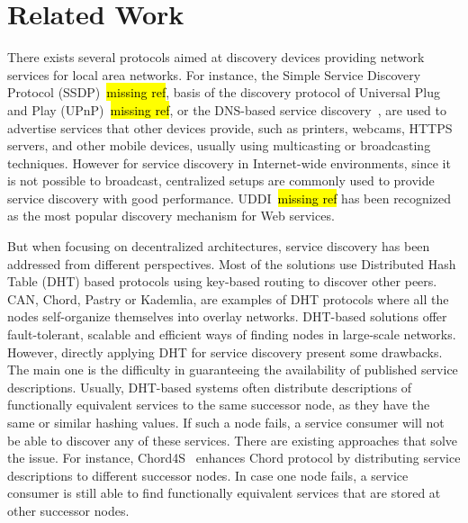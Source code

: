 
\section{Related Work}
\label{sec:related}


There exists several protocols aimed at discovery devices providing network services for local area networks.
For instance, the Simple Service Discovery Protocol (SSDP)~\hl{missing ref}, basis of the discovery protocol of Universal Plug and Play (UPnP)~\hl{missing ref}, or the DNS-based service discovery~\cite{RFC6763}, are used to advertise services that other devices provide, such as printers, webcams, HTTPS servers, and other mobile devices, usually using multicasting or broadcasting techniques.
However for service discovery in Internet-wide environments, since it is not possible to broadcast, centralized setups are commonly used to provide service discovery with good performance.
UDDI~\hl{missing ref} has been recognized as the most popular discovery mechanism for Web services.

But when focusing on decentralized architectures, service discovery has been addressed from different perspectives. 
Most of the solutions use Distributed Hash Table (DHT) based protocols using key-based routing to discover other peers. 
CAN, Chord,  Pastry or Kademlia, are examples of DHT protocols where all the nodes self-organize themselves into overlay networks. 
DHT-based solutions offer fault-tolerant, scalable and efficient ways of finding nodes in large-scale networks.
However, directly applying DHT for service discovery  present some drawbacks.
The main one is the difficulty in guaranteeing the availability of published service descriptions.
Usually,  DHT-based systems often distribute descriptions of functionally equivalent services to the same successor node,  as they have the same or similar hashing values. 
If such a node fails, a service consumer will not be able to discover any of these services. 
There are existing approaches that solve the issue. 
For instance,  Chord4S~\cite{chord4s} enhances Chord protocol by distributing service descriptions to different successor nodes. 
In case one node fails, a service consumer is still able to find functionally equivalent services that are stored at other successor nodes.

